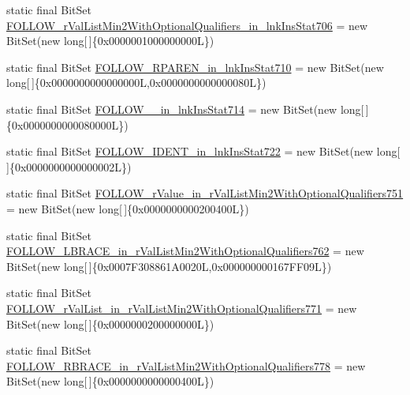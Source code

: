 \begin{DoxyCompactItemize}
\item 
static final Bit\-Set \hyperlink{classorg_1_1tzi_1_1use_1_1parser_1_1soil_1_1_soil_parser_a4fc474a9d44a40ab92bac29c2cb34287}{F\-O\-L\-L\-O\-W\-\_\-r\-Val\-List\-Min2\-With\-Optional\-Qualifiers\-\_\-in\-\_\-lnk\-Ins\-Stat706} = new Bit\-Set(new long\mbox{[}$\,$\mbox{]}\{0x0000001000000000\-L\})
\item 
static final Bit\-Set \hyperlink{classorg_1_1tzi_1_1use_1_1parser_1_1soil_1_1_soil_parser_accd16e184677d5ba3ed3283652212570}{F\-O\-L\-L\-O\-W\-\_\-\-R\-P\-A\-R\-E\-N\-\_\-in\-\_\-lnk\-Ins\-Stat710} = new Bit\-Set(new long\mbox{[}$\,$\mbox{]}\{0x0000000000000000\-L,0x0000000000000080\-L\})
\item 
static final Bit\-Set \hyperlink{classorg_1_1tzi_1_1use_1_1parser_1_1soil_1_1_soil_parser_ae3f6896ec2a559f17d406e624be9863d}{F\-O\-L\-L\-O\-W\-\_\-\_\-in\-\_\-lnk\-Ins\-Stat714} = new Bit\-Set(new long\mbox{[}$\,$\mbox{]}\{0x0000000000080000\-L\})
\item 
static final Bit\-Set \hyperlink{classorg_1_1tzi_1_1use_1_1parser_1_1soil_1_1_soil_parser_aac5568acd72fbdc664fc189f6789eade}{F\-O\-L\-L\-O\-W\-\_\-\-I\-D\-E\-N\-T\-\_\-in\-\_\-lnk\-Ins\-Stat722} = new Bit\-Set(new long\mbox{[}$\,$\mbox{]}\{0x0000000000000002\-L\})
\item 
static final Bit\-Set \hyperlink{classorg_1_1tzi_1_1use_1_1parser_1_1soil_1_1_soil_parser_afa7786e21b774d9ce868387fe43292cd}{F\-O\-L\-L\-O\-W\-\_\-r\-Value\-\_\-in\-\_\-r\-Val\-List\-Min2\-With\-Optional\-Qualifiers751} = new Bit\-Set(new long\mbox{[}$\,$\mbox{]}\{0x0000000000200400\-L\})
\item 
static final Bit\-Set \hyperlink{classorg_1_1tzi_1_1use_1_1parser_1_1soil_1_1_soil_parser_a1ca7cc264cd528f090a3296cf4555611}{F\-O\-L\-L\-O\-W\-\_\-\-L\-B\-R\-A\-C\-E\-\_\-in\-\_\-r\-Val\-List\-Min2\-With\-Optional\-Qualifiers762} = new Bit\-Set(new long\mbox{[}$\,$\mbox{]}\{0x0007\-F308861\-A0020\-L,0x000000000167\-F\-F09\-L\})
\item 
static final Bit\-Set \hyperlink{classorg_1_1tzi_1_1use_1_1parser_1_1soil_1_1_soil_parser_a04b80bd5e78b80b53fdfb4ad8668fd53}{F\-O\-L\-L\-O\-W\-\_\-r\-Val\-List\-\_\-in\-\_\-r\-Val\-List\-Min2\-With\-Optional\-Qualifiers771} = new Bit\-Set(new long\mbox{[}$\,$\mbox{]}\{0x0000000200000000\-L\})
\item 
static final Bit\-Set \hyperlink{classorg_1_1tzi_1_1use_1_1parser_1_1soil_1_1_soil_parser_abe74106e22df6b3556120c0ce0da7019}{F\-O\-L\-L\-O\-W\-\_\-\-R\-B\-R\-A\-C\-E\-\_\-in\-\_\-r\-Val\-List\-Min2\-With\-Optional\-Qualifiers778} = new Bit\-Set(new long\mbox{[}$\,$\mbox{]}\{0x0000000000000400\-L\})

\end{DoxyCompactItemize}

